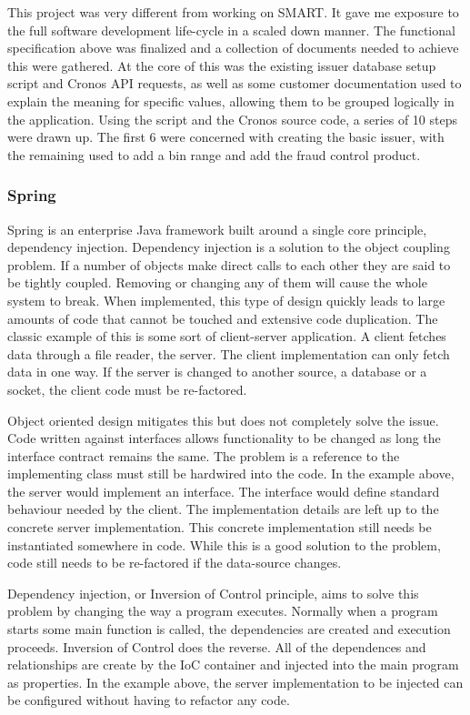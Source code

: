 \documentclass[a4paper, 11pt, titlepage]{article}
\begin{document}
This project was very different from working on SMART. It gave me exposure to the full software development life-cycle in a scaled down manner. The functional specification above was finalized and a collection of documents needed to achieve this were gathered. At the core of this was the existing issuer database setup script and Cronos API requests, as well as some customer documentation used to explain the meaning for specific values, allowing them to be grouped logically in the application. 
Using the script and the Cronos source code, a series of 10 steps were drawn up. The first 6 were concerned with creating the basic issuer, with the remaining used to add a bin range and add the fraud control product. 
 
\subsubsection{Spring} 
 
Spring is an enterprise Java framework built around a single core principle, dependency injection. Dependency injection is a solution to the object coupling problem. If a number of objects make direct calls to each other they are said to be tightly coupled. Removing or changing any of them will cause the whole system to break. When implemented, this type of design quickly leads to large amounts of code that cannot be touched and extensive code duplication. The classic example of this is some sort of client-server application. A client fetches data through a file reader, the server. The client implementation can only fetch data in one way. If the server is changed to another source, a database or a socket, the client code must be re-factored.  
 
Object oriented design mitigates this but does not completely solve the issue. Code written against interfaces allows functionality to be changed as long the interface contract remains the same. The problem is a reference to the implementing class must still be hardwired into the code. In the example above, the server would implement an interface. The interface would define standard behaviour needed by the client. The implementation details are left up to the concrete server implementation. This concrete implementation still needs be instantiated somewhere in code. While this is a good solution to the problem, code still needs to be re-factored if the data-source changes. 
 
Dependency injection, or Inversion of Control principle, aims to solve this problem by changing the way a program executes. Normally when a program starts some main function is called, the dependencies are created and execution proceeds. Inversion of Control does the reverse. All of the dependences and relationships are create by the IoC container and injected into the main program as properties.  In the example above, the server implementation to be injected can be configured without having to refactor any code. 
 
\end{document}
